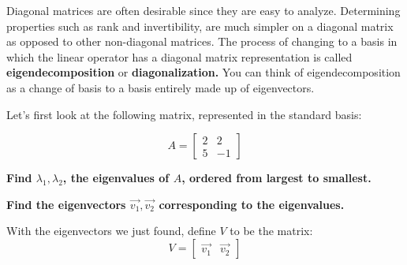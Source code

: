 


Diagonal matrices are often desirable since they are easy to analyze. 
Determining properties such as rank and invertibility, are much simpler on a diagonal matrix as opposed to other non-diagonal matrices.
The process of changing to a basis in which the linear operator has a diagonal matrix representation is called \textbf{eigendecomposition} or \textbf{diagonalization.} You can think of eigendecomposition as a change of basis to a basis entirely made up of eigenvectors.

Let's first look at the following matrix, represented in the standard basis:

$$A = \begin{bmatrix}
2 & 2 \\
5 & -1
\end{bmatrix}$$

\begin{enumerate}

\qitem \textbf{Find $\lambda_1, \lambda_2$, the eigenvalues of $A$, ordered from largest to smallest.}
\vspace{2em}

\meta{}

\sol{}

\qitem \textbf{Find the eigenvectors $\vec{v_1}, \vec{v_2}$ corresponding to the eigenvalues.}
\vspace{2em}

\meta{}

\sol{}

\end{enumerate}

With the eigenvectors we just found, define $V$ to be the matrix:
$$V = \begin{bmatrix}
\vec{v_1} & \vec{v_2}
\end{bmatrix}$$

